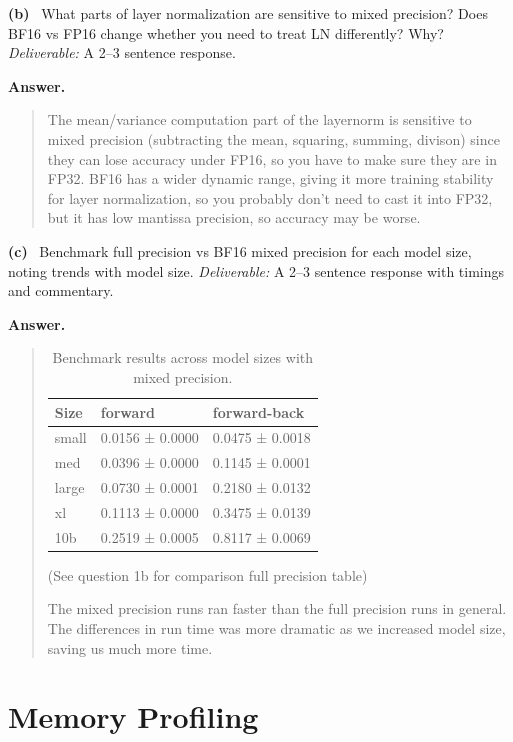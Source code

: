 \documentclass[11pt]{article}
\newcommand{\subq}[1]{\vspace{0.3em}\noindent\textbf{(#1)}\ }
\newcommand{\deliverable}[1]{\vspace{0.2em}\noindent\textit{Deliverable:} #1\par}
\newenvironment{answer}{%
  \vspace{0.3em}%
  \noindent\textbf{Answer.}\begin{quote}%
}{%
  \end{quote}\vspace{0.4em}%
}
\begin{document}
\subq{b} What parts of layer normalization are sensitive to mixed precision? Does BF16 vs FP16 change whether you need to treat LN differently? Why?
\deliverable{A 2--3 sentence response.}
\begin{answer}
  The mean/variance computation part of the layernorm is sensitive to mixed precision (subtracting the mean, squaring, summing, divison) since they can lose
  accuracy under FP16, so you have to make sure they are in FP32. 
  BF16 has a wider dynamic range, giving it more training stability for layer normalization, so you probably don't need to cast it into FP32, but
  it has low mantissa precision, so accuracy may be worse. 
\end{answer}

\subq{c} Benchmark full precision vs BF16 mixed precision for each model size, noting trends with model size.
\deliverable{A 2--3 sentence response with timings and commentary.}
\begin{answer}
  \begin{table}[H]
    \caption{Benchmark results across model sizes with mixed precision.}
    \centering
    \label{tab:model-benchmark-mixed-precision-results}
    \begin{tabular}{lll}
    \toprule
    Size & forward & forward-back \\
    \midrule
    small & 0.0156 ± 0.0000 & 0.0475 ± 0.0018 \\
    med & 0.0396 ± 0.0000 & 0.1145 ± 0.0001 \\
    large & 0.0730 ± 0.0001 & 0.2180 ± 0.0132 \\
    xl & 0.1113 ± 0.0000 & 0.3475 ± 0.0139 \\
    10b & 0.2519 ± 0.0005 & 0.8117 ± 0.0069 \\
    \bottomrule
    \end{tabular}
    \end{table}    

    (See question 1b for comparison full precision table)

    The mixed precision runs ran faster than the full precision runs in general. 
    The differences in run time was more dramatic as we increased model size, saving 
    us much more time.
\end{answer}


\section{Memory Profiling}
\end{document}
